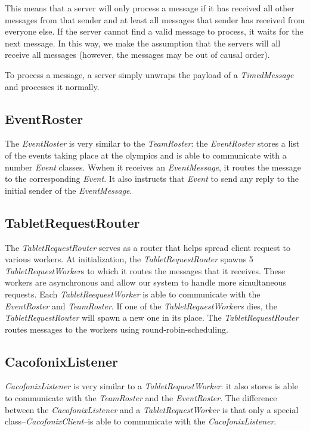 \documentclass[11pt]{article}
\begin{document}
This means that a server will only process a message if it has
received all other messages from that sender and at least all messages
that sender has received from everyone else.  If the server cannot
find a valid message to process, it waits for the next message. In
this way, we make the assumption that the servers will all receive all
messages (however, the messages may be out of causal order).

To process a message, a server simply unwraps the payload of a
\emph{TimedMessage} and processes it normally.

\subsection{EventRoster}
The \emph{EventRoster} is very similar to the \emph{TeamRoster}: the
\emph{EventRoster} stores a list of the events taking place at the
olympics and is able to communicate with a number \emph{Event}
classes.  Wwhen it receives an \emph{EventMessage}, it routes the
message to the corresponding \emph{Event}.  It also instructs that
\emph{Event} to send any reply to the initial sender of the
\emph{EventMessage}.

\subsection{TabletRequestRouter}
The \emph{TabletRequestRouter} serves as a router that helps spread
client request to various workers.  At initialization, the
\emph{TabletRequestRouter} spawns 5 \emph{TabletRequestWorker}s to
which it routes the messages that it receives.  These workers are
asynchronous and allow our system to handle more simultaneous
requests.  Each \emph{TabletReequestWorker} is able to communicate
with the \emph{EventRoster} and \emph{TeamRoster}. If one of the
\emph{TabletRequestWorkers} dies, the \emph{TabletRequestRouter} will
spawn a new one in its place. The \emph{TabletRequestRouter} routes
messages to the workers using round-robin-scheduling.

\subsection{CacofonixListener}
\emph{CacofonixListener} is very similar to a
\emph{TabletRequestWorker}: it also stores is able to communicate with
the \emph{TeamRoster} and the \emph{EventRoster}.  The difference
between the \emph{CacofonixListener} and a \emph{TabletRequestWorker}
is that only a special class--\emph{CacofonixClient}--is able to
communicate with the \emph{CacofonixListener}.
\end{document}
